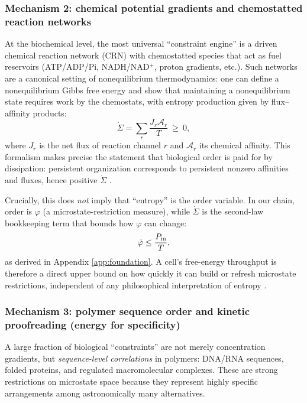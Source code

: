 \documentclass[10pt]{article}
\begin{document}
\subsubsection{Mechanism 2: chemical potential gradients and chemostatted reaction networks}
At the biochemical level, the most universal ``constraint engine'' is a driven chemical reaction
network (CRN) with chemostatted species that act as fuel reservoirs (ATP/ADP/Pi, NADH/NAD\(^+\),
proton gradients, etc.). Such networks are a canonical setting of nonequilibrium thermodynamics:
one can define a nonequilibrium Gibbs free energy and show that maintaining a nonequilibrium state
requires work by the chemostats, with entropy production given by flux--affinity products:
\begin{equation}
\dot\Sigma = \sum_r \frac{J_r \mathcal{A}_r}{T}\ \ge\ 0,
\end{equation}
where \(J_r\) is the net flux of reaction channel \(r\) and \(\mathcal{A}_r\) its chemical affinity.
This formalism makes precise the statement that biological order is paid for by dissipation:
persistent organization corresponds to persistent nonzero affinities and fluxes, hence positive 
\(\dot\Sigma\) \cite{Seifert2012ST,Schnakenberg1976,Hill1977FreeEnergyTransduction}.

Crucially, this does \emph{not} imply that ``entropy'' is the order variable. In our chain, order is
\(\varphi\) (a microstate-restriction measure), while \(\dot\Sigma\) is the second-law bookkeeping
term that bounds how \(\varphi\) can change:
\begin{equation}
\dot\varphi \le \frac{P_{\rm in}}{T},
\end{equation}
as derived in Appendix \ref{app:foundation}. A cell’s free-energy throughput is therefore a direct
upper bound on how quickly it can build or refresh microstate restrictions, independent of any 
philosophical interpretation of entropy \cite{Seifert2012ST,Parrondo2015ThermoInfo}.

\subsubsection{Mechanism 3: polymer sequence order and kinetic proofreading (energy for specificity)}
A large fraction of biological ``constraints'' are not merely concentration gradients, but
\emph{sequence-level correlations} in polymers: DNA/RNA sequences, folded proteins, and regulated
macromolecular complexes. These are strong restrictions on microstate space because they represent
highly specific arrangements among astronomically many alternatives.
\end{document}
